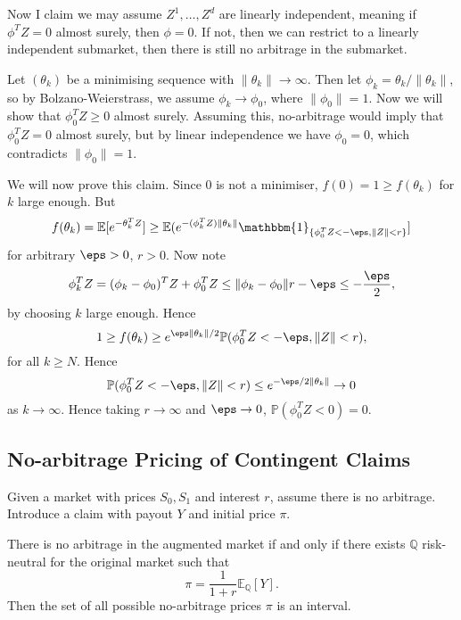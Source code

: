 \documentclass[12pt]{article}
\begin{document}
\begin{proofbox}
\begin{enumerate}
			Now I claim we may assume $Z^1, \ldots, Z^d$ are linearly independent, meaning if $\phi^{T}Z = 0$ almost surely, then $\phi = 0$. If not, then we can restrict to a linearly independent submarket, then there is still no arbitrage in the submarket.

			Let $(\theta_k)$ be a minimising sequence with $\|\theta_k\| \to \infty$. Then let $\phi_k = \theta_k/\|\theta_k\|$, so by Bolzano-Weierstrass, we assume $\phi_k \to \phi_0$, where $\|\phi_0\| = 1$. Now we will show that $\phi_0^{T}Z \geq 0$ almost surely. Assuming this, no-arbitrage would imply that $\phi_0^{T}Z = 0$ almost surely, but by linear independence we have $\phi_0 = 0$, which contradicts $\|\phi_0\| = 1$.

			We will now prove this claim. Since $0$ is not a minimiser, $f(0) = 1 \geq f(\theta_k)$ for $k$ large enough. But
			\[
				f(\theta_k) = \mathbb{E}[e^{-\theta_k^{T}Z}] \geq \mathbb{E}(e^{-(\phi_k^{T}Z)\|\theta_k\|} \mathbbm{1}_{\{\phi_0^{T}Z < -\eps, \|Z\| < r\}}]
			\]
			for arbitrary $\eps > 0$, $r > 0$. Now note
			\[
			\phi_k^{T} Z = (\phi_k - \phi_0)^{T} Z + \phi_0^{T} Z \leq \|\phi_k - \phi_0\|r - \eps \leq - \frac{\eps}{2},
			\]
			by choosing $k$ large enough. Hence
			\[
			1 \geq f(\theta_k) \geq e^{\eps \|\theta_k\|/2} \mathbb{P}(\phi_0^{T} Z < -\eps, \|Z\| < r),
			\]
			for all $k \geq N$. Hence
			\[
			\mathbb{P}(\phi_0^{T} Z < -\eps, \|Z\| < r) \leq e^{-\eps/2 \|\theta_k\|} \to 0
			\]
			as $k \to \infty$. Hence taking $r \to \infty$ and $\eps \to 0$, $\mathbb{P}(\phi_0^{T} Z < 0) = 0$.
	\end{enumerate}
\end{proofbox}

\subsection{No-arbitrage Pricing of Contingent Claims}
\label{sub:no_arb_price}

\begin{theorem}
	Given a market with prices $S_0, S_1$ and interest $r$, assume there is no arbitrage. Introduce a claim with payout $Y$ and initial price $\pi$.

	There is no arbitrage in the augmented market if and only if there exists $\mathbb{Q}$ risk-neutral for the original market such that
	\[
	\pi = \frac{1}{1+r} \mathbb{E}_{\mathbb{Q}}[Y].
	\]
	Then the set of all possible no-arbitrage prices $\pi$ is an interval.
\end{theorem}
\end{document}
